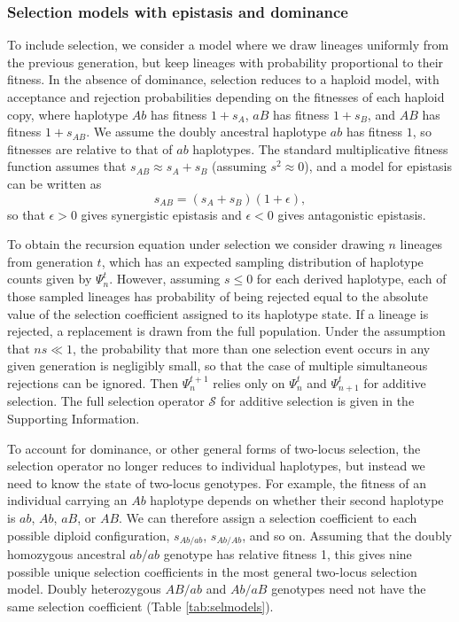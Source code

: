 \documentclass[]{article}
\begin{document}
\subsubsection{Selection models with epistasis and dominance}

To include selection, we consider a model where we draw lineages uniformly from
the previous generation, but keep lineages with probability proportional to
their fitness. In the absence of dominance, selection reduces to a haploid
model, with acceptance and rejection probabilities depending on the fitnesses
of each haploid copy, where haplotype \(Ab\) has fitness \(1 + s_{A}\), \(aB\)
has fitness \(1 + s_{B}\), and \(AB\) has fitness \(1 + s_{AB}\). We assume the
doubly ancestral haplotype \(ab\) has fitness \(1\), so fitnesses are relative
to that of \(ab\) haplotypes. The standard multiplicative fitness function
assumes that \(s_{AB} \approx s_{A} + s_{B}\) (assuming \(s^2\approx0\)), and a
model for epistasis can be written as \[s_{AB} = (s_{A} + s_{B}) (1 +
\epsilon),\] so that \(\epsilon > 0\) gives synergistic epistasis and
\(\epsilon < 0\) gives antagonistic epistasis.

To obtain the recursion equation under selection we consider drawing \(n\)
lineages from generation \(t\), which has an expected sampling distribution of
haplotype counts given by \(\Psi_n^t\). However, assuming \(s\leq0\) for each
derived haplotype, each of those sampled lineages has probability of being
rejected equal to the absolute value of the selection coefficient assigned to
its haplotype state. If a lineage is rejected, a replacement is drawn from the
full population. Under the assumption that \(ns \ll 1\), the probability that
more than one selection event occurs in any given generation is negligibly
small, so that the case of multiple simultaneous rejections can be ignored.
Then \(\Psi_n^{t+1}\) relies only on \(\Psi_n^t\) and \(\Psi_{n+1}^t\) for
additive selection. The full selection operator \(\mathcal{S}\) for additive
selection is given in the Supporting Information.

To account for dominance, or other general forms of two-locus selection, the
selection operator no longer reduces to individual haplotypes, but instead we
need to know the state of two-locus genotypes. For example, the fitness of an
individual carrying an \(Ab\) haplotype depends on whether their second
haplotype is \(ab\), \(Ab\), \(aB\), or \(AB\). We can therefore assign a
selection coefficient to each possible diploid configuration, \(s_{Ab/ab}\),
\(s_{Ab/Ab}\), and so on. Assuming that the doubly homozygous ancestral
\(ab/ab\) genotype has relative fitness 1, this gives nine possible unique
selection coefficients in the most general two-locus selection model. Doubly
heterozygous \(AB/ab\) and \(Ab/aB\) genotypes need not have the same selection
coefficient (Table \ref{tab:selmodels}).
\end{document}
